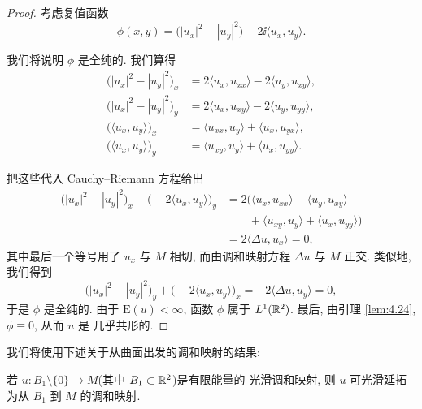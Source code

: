 \begin{proof}
考虑复值函数
\begin{equation}
\phi(x,y)=\bigl(|u_x|^2-|u_y|^2\bigr)-2\ii\langle u_x,u_y\rangle.
\label{eq:4.54}
\end{equation}

我们将说明 $\phi$ 是全纯的. 我们算得
\begin{align}
\bigl(|u_x|^2-|u_y|^2\bigr)_x
 &=2\langle u_x,u_{xx}\rangle-2\langle u_y,u_{xy}\rangle,\label{eq:4.55}\\
\bigl(|u_x|^2-|u_y|^2\bigr)_y
 &=2\langle u_x,u_{xy}\rangle-2\langle u_y,u_{yy}\rangle,\label{eq:4.56}\\
\bigl(\langle u_x,u_y\rangle\bigr)_x
 &=\langle u_{xx},u_y\rangle+\langle u_x,u_{yx}\rangle,\label{eq:4.57}\\
\bigl(\langle u_x,u_y\rangle\bigr)_y
 &=\langle u_{xy},u_y\rangle+\langle u_x,u_{yy}\rangle.\label{eq:4.58}
\end{align}

把这些代入 Cauchy--Riemann 方程给出
\begin{equation}
\begin{aligned}
\bigl(|u_x|^2-|u_y|^2\bigr)_x
 -\bigl(-2\langle u_x,u_y\rangle\bigr)_y
&=2\bigl(\langle u_x,u_{xx}\rangle-\langle u_y,u_{xy}\rangle\\
&\qquad+\langle u_{xy},u_y\rangle+\langle u_x,u_{yy}\rangle\bigr)\\
&=2\langle\Delta u,u_x\rangle=0,
\end{aligned}
\label{eq:4.59}
\end{equation}
其中最后一个等号用了 $u_x$ 与 $M$ 相切, 而由调和映射方程 $\Delta u$
与 $M$ 正交. 类似地, 我们得到
\begin{equation}
\bigl(|u_x|^2-|u_y|^2\bigr)_y
 +\bigl(-2\langle u_x,u_y\rangle\bigr)_x
 =-2\langle\Delta u,u_y\rangle=0,
\label{eq:4.60}
\end{equation}
于是 $\phi$ 是全纯的. 由于 $\mathrm{E}(u)<\infty$, 函数 $\phi$ 属于
$L^1(\mathbb{R}^2)$. 最后, 由引理 \ref{lem:4.24}, $\phi\equiv0$, 从而 $u$ 是
几乎共形的.
\end{proof}

我们将使用下述关于从曲面出发的调和映射的结果:

\begin{theorem}
\label{thm:4.26}
若 $u:B_1\setminus\{0\}\to M$(其中 $B_1\subset\mathbb{R}^2$)是有限能量的
光滑调和映射, 则 $u$ 可光滑延拓为从 $B_1$ 到 $M$ 的调和映射.
\end{theorem}

